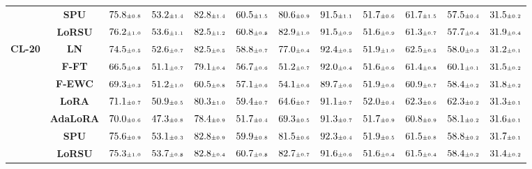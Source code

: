 \begin{table}
\begin{center}
\begin{small}
\begin{tabular}{l c c c c c c c c c c c}
& \textbf{SPU} & $75.8 \mtiny{\pm 0.8}$ & $53.2 \mtiny{\pm 1.4}$ & $82.8 \mtiny{\pm 1.4}$ & $60.5 \mtiny{\pm 1.5}$ & $80.6 \mtiny{\pm 0.9}$ & $91.5 \mtiny{\pm 1.1}$ & $51.7 \mtiny{\pm 0.6}$ & $61.7 \mtiny{\pm 1.5}$ & $57.5 \mtiny{\pm 0.4}$ & $31.5 \mtiny{\pm 0.2}$ \\
& \textbf{LoRSU} & $76.2 \mtiny{\pm 1.0}$ & $53.6 \mtiny{\pm 1.1}$ & $82.5 \mtiny{\pm 1.2}$ & $60.8 \mtiny{\pm 0.8}$ & $82.9 \mtiny{\pm 1.0}$ & $91.5 \mtiny{\pm 0.9}$ & $51.6 \mtiny{\pm 0.9}$ & $61.3 \mtiny{\pm 0.7}$ & $57.7 \mtiny{\pm 0.4}$ & $31.9 \mtiny{\pm 0.4}$ \\
\midrule
\multirow{7}{*}{\textbf{CL-20}} & \textbf{LN} & $74.5 \mtiny{\pm 0.5}$ & $52.6 \mtiny{\pm 0.7}$ & $82.5 \mtiny{\pm 0.5}$ & $58.8 \mtiny{\pm 0.7}$ & $77.0 \mtiny{\pm 0.4}$ & $92.4 \mtiny{\pm 0.5}$ & $51.9 \mtiny{\pm 1.0}$ & $62.5 \mtiny{\pm 0.5}$ & $58.0 \mtiny{\pm 0.3}$ & $31.2 \mtiny{\pm 0.1}$ \\
& \textbf{F-FT} & $66.5 \mtiny{\pm 0.8}$ & $51.1 \mtiny{\pm 0.7}$ & $79.1 \mtiny{\pm 0.4}$ & $56.7 \mtiny{\pm 0.6}$ & $51.2 \mtiny{\pm 0.7}$ & $92.0 \mtiny{\pm 0.4}$ & $51.6 \mtiny{\pm 0.6}$ & $61.4 \mtiny{\pm 0.8}$ & $60.1 \mtiny{\pm 0.1}$ & $31.5 \mtiny{\pm 0.2}$ \\
& \textbf{F-EWC} & $69.3 \mtiny{\pm 0.3}$ & $51.2 \mtiny{\pm 1.0}$ & $60.5 \mtiny{\pm 0.8}$ & $57.1 \mtiny{\pm 0.6}$ & $54.1 \mtiny{\pm 0.6}$ & $89.7 \mtiny{\pm 0.6}$ & $51.9 \mtiny{\pm 0.6}$ & $60.9 \mtiny{\pm 0.7}$ & $58.4 \mtiny{\pm 0.2}$ & $31.8 \mtiny{\pm 0.2}$ \\
& \textbf{LoRA} & $71.1 \mtiny{\pm 0.7}$ & $50.9 \mtiny{\pm 0.5}$ & $80.3 \mtiny{\pm 1.0}$ & $59.4 \mtiny{\pm 0.7}$ & $64.6 \mtiny{\pm 0.7}$ & $91.1 \mtiny{\pm 0.7}$ & $52.0 \mtiny{\pm 0.4}$ & $62.3 \mtiny{\pm 0.6}$ & $62.3 \mtiny{\pm 0.2}$ & $31.3 \mtiny{\pm 0.1}$ \\
& \textbf{AdaLoRA} & $70.0 \mtiny{\pm 0.6}$ & $47.3 \mtiny{\pm 0.8}$ & $78.4 \mtiny{\pm 0.9}$ & $51.7 \mtiny{\pm 0.4}$ & $69.3 \mtiny{\pm 0.5}$ & $91.3 \mtiny{\pm 0.7}$ & $51.7 \mtiny{\pm 0.9}$ & $60.8 \mtiny{\pm 0.9}$ & $58.1 \mtiny{\pm 0.2}$ & $31.6 \mtiny{\pm 0.1}$ \\
& \textbf{SPU} & $75.6 \mtiny{\pm 0.9}$ & $53.1 \mtiny{\pm 0.3}$ & $82.8 \mtiny{\pm 0.9}$ & $59.9 \mtiny{\pm 0.8}$ & $81.5 \mtiny{\pm 0.6}$ & $92.3 \mtiny{\pm 0.4}$ & $51.9 \mtiny{\pm 0.5}$ & $61.5 \mtiny{\pm 0.8}$ & $58.8 \mtiny{\pm 0.2}$ & $31.7 \mtiny{\pm 0.1}$ \\
& \textbf{LoRSU} & $75.3 \mtiny{\pm 1.0}$ & $53.7 \mtiny{\pm 0.8}$ & $82.8 \mtiny{\pm 0.4}$ & $60.7 \mtiny{\pm 0.8}$ & $82.7 \mtiny{\pm 0.7}$ & $91.6 \mtiny{\pm 0.6}$ & $51.6 \mtiny{\pm 0.4}$ & $61.5 \mtiny{\pm 0.4}$ & $58.4 \mtiny{\pm 0.2}$ & $31.4 \mtiny{\pm 0.2}$ \\

\end{tabular}
\end{small}
\end{center}
\end{table}
